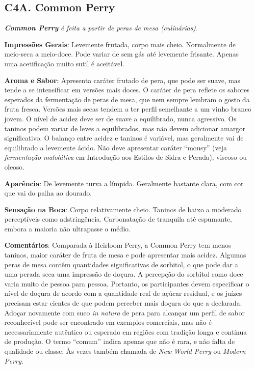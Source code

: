 \subsection*{C4A. Common Perry}

\textit{\textbf{Common Perry} é feita a partir de peras de mesa (culinárias).}

\textbf{Impressões Gerais}: Levemente frutada, corpo mais cheio. Normalmente de meio-seca a meio-doce. Pode variar de sem gás até levemente frisante. Apenas uma acetificação muito sutil é aceitável.

\textbf{Aroma e Sabor}: Apresenta caráter frutado de pera, que pode ser suave, mas tende a se intensificar em versões mais doces. O caráter de pera reflete os sabores esperados da fermentação de peras de mesa, que nem sempre lembram o gosto da fruta fresca. Versões mais secas tendem a ter perfil semelhante a um vinho branco jovem. O nível de acidez deve ser de suave a equilibrado, nunca agressivo. Os taninos podem variar de leves a equilibrados, mas não devem adicionar amargor significativo. O balanço entre acidez e taninos é variável, mas geralmente vai de equilibrado a levemente ácido. Não deve apresentar caráter “mousy” (veja \textit{fermentação malolática} em Introdução aos Estilos de Sidra e Perada), viscoso ou oleoso.

\textbf{Aparência}: De levemente turva a límpida. Geralmente bastante clara, com cor que vai do palha ao dourado.

\textbf{Sensação na Boca}: Corpo relativamente cheio. Taninos de baixo a moderado perceptíveis como adstringência. Carbonatação de tranquila até espumante, embora a maioria não ultrapasse o médio.

\textbf{Comentários}: Comparada à Heirloom Perry, a Common Perry tem menos taninos, maior caráter de fruta de mesa e pode apresentar mais acidez. Algumas peras de mesa contêm quantidades significativas de sorbitol, o que pode dar a uma perada seca uma impressão de doçura. A percepção do sorbitol como doce varia muito de pessoa para pessoa. Portanto, os participantes devem especificar o nível de doçura de acordo com a quantidade real de açúcar residual, e os juízes precisam estar cientes de que podem perceber mais doçura do que a declarada. Adoçar novamente com suco \textit{in natura} de pera para alcançar um perfil de sabor reconhecível pode ser encontrado em exemplos comerciais, mas não é necessariamente autêntico ou esperado em regiões com tradição longa e contínua de produção. O termo “comum” indica apenas que não é rara, e não falta de qualidade ou classe. Às vezes também chamada de \textit{New World Perry} ou \textit{Modern Perry}.

